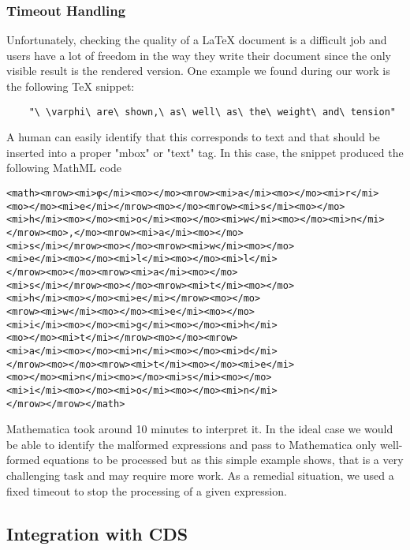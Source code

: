 \subsubsection{Timeout Handling}
Unfortunately, checking the quality of a LaTeX document is a difficult job and users have a lot of freedom in the way they write their document since the only visible result is the rendered version. 
One example we found during our work is the following TeX snippet:
\begin{verbatim}
	"\ \varphi\ are\ shown,\ as\ well\ as\ the\ weight\ and\ tension"
\end{verbatim}
A human can easily identify that this corresponds to text and that should be inserted into a proper "mbox" or "text" tag. In this case, the snippet produced the following MathML code
\begin{verbatim}
<math><mrow><mi>φ</mi><mo></mo><mrow><mi>a</mi><mo></mo><mi>r</mi>
<mo></mo><mi>e</mi></mrow><mo></mo><mrow><mi>s</mi><mo></mo>
<mi>h</mi><mo></mo><mi>o</mi><mo></mo><mi>w</mi><mo></mo><mi>n</mi>
</mrow><mo>,</mo><mrow><mi>a</mi><mo></mo>
<mi>s</mi></mrow><mo></mo><mrow><mi>w</mi><mo></mo>
<mi>e</mi><mo></mo><mi>l</mi><mo></mo><mi>l</mi>
</mrow><mo></mo><mrow><mi>a</mi><mo></mo>
<mi>s</mi></mrow><mo></mo><mrow><mi>t</mi><mo></mo>
<mi>h</mi><mo></mo><mi>e</mi></mrow><mo></mo>
<mrow><mi>w</mi><mo></mo><mi>e</mi><mo></mo>
<mi>i</mi><mo></mo><mi>g</mi><mo></mo><mi>h</mi>
<mo></mo><mi>t</mi></mrow><mo></mo><mrow>
<mi>a</mi><mo></mo><mi>n</mi><mo></mo><mi>d</mi>
</mrow><mo></mo><mrow><mi>t</mi><mo></mo><mi>e</mi>
<mo></mo><mi>n</mi><mo></mo><mi>s</mi><mo></mo>
<mi>i</mi><mo></mo><mi>o</mi><mo></mo><mi>n</mi>
</mrow></mrow></math>
\end{verbatim}

Mathematica took around 10 minutes to interpret it.
In the ideal case we would be able to identify the malformed expressions and pass to Mathematica only well-formed equations to be processed but as this simple example shows, that is a very challenging task and may require more work.
As a remedial situation, we used a fixed timeout to stop the processing of a given expression.

\subsection{Integration with CDS}
